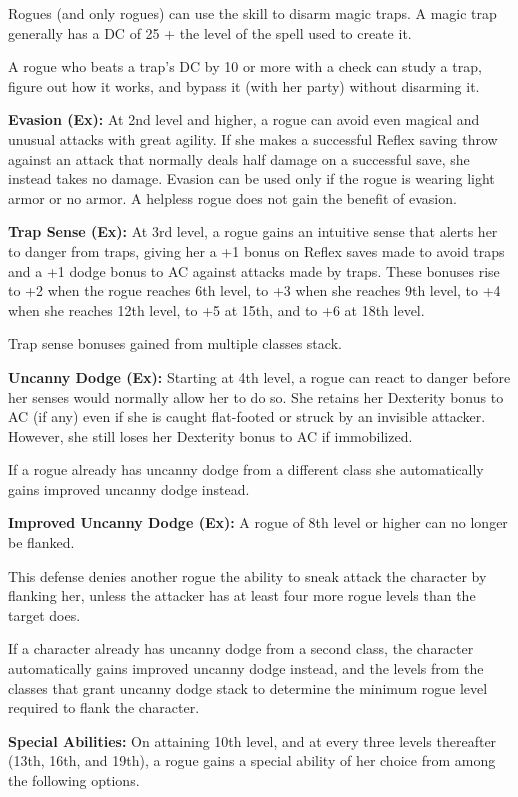 Rogues (and only rogues) can use the  skill to disarm magic traps. A magic trap generally has a DC of 25 + the level of the spell used to create it.

A rogue who beats a trap's DC by 10 or more with a  check can study a trap, figure out how it works, and bypass it (with her party) without disarming it.

\textbf{Evasion (Ex):} At 2nd level and higher, a rogue can avoid even magical and unusual attacks with great agility. If she makes a successful Reflex saving throw against an attack that normally deals half damage on a successful save, she instead takes no damage. Evasion can be used only if the rogue is wearing light armor or no armor. A helpless rogue does not gain the benefit of evasion.

\textbf{Trap Sense (Ex):} At 3rd level, a rogue gains an intuitive sense that alerts her to danger from traps, giving her a +1 bonus on Reflex saves made to avoid traps and a +1 dodge bonus to AC against attacks made by traps. These bonuses rise to +2 when the rogue reaches 6th level, to +3 when she reaches 9th level, to +4 when she reaches 12th level, to +5 at 15th, and to +6 at 18th level.

Trap sense bonuses gained from multiple classes stack.

\textbf{Uncanny Dodge (Ex):} Starting at 4th level, a rogue can react to danger before her senses would normally allow her to do so. She retains her Dexterity bonus to AC (if any) even if she is caught flat-footed or struck by an invisible attacker. However, she still loses her Dexterity bonus to AC if immobilized.

If a rogue already has uncanny dodge from a different class she automatically gains improved uncanny dodge instead.

\textbf{Improved Uncanny Dodge (Ex):} A rogue of 8th level or higher can no longer be flanked.

This defense denies another rogue the ability to sneak attack the character by flanking her, unless the attacker has at least four more rogue levels than the target does.

If a character already has uncanny dodge from a second class, the character automatically gains improved uncanny dodge instead, and the levels from the classes that grant uncanny dodge stack to determine the minimum rogue level required to flank the character.

\textbf{Special Abilities:} On attaining 10th level, and at every three levels thereafter (13th, 16th, and 19th), a rogue gains a special ability of her choice from among the following options.

